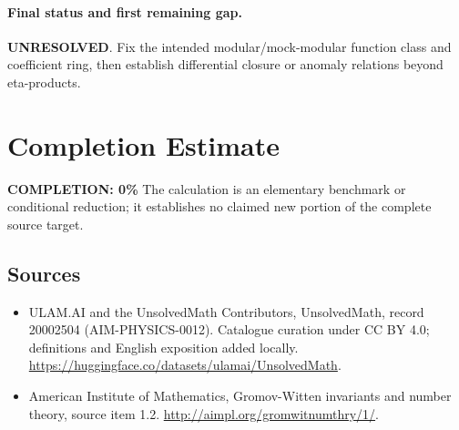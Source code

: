 \documentclass[11pt]{article}
\begin{document}
\paragraph{Final status and first remaining gap.}
\textbf{UNRESOLVED}. Fix the intended modular/mock-modular function class and coefficient ring, then establish differential closure or anomaly relations beyond eta-products.

\section{Completion Estimate}
\noindent\textbf{COMPLETION: 0\%}
The calculation is an elementary benchmark or conditional reduction; it establishes no claimed new portion of the complete source target.

\subsection{Sources}
\begin{itemize}
\item[\hypertarget{source:20002504:1}{S1}] ULAM.AI and the UnsolvedMath Contributors, UnsolvedMath, record 20002504 (AIM-PHYSICS-0012). Catalogue curation under CC BY 4.0; definitions and English exposition added locally.
\url{https://huggingface.co/datasets/ulamai/UnsolvedMath}.
\item[\hypertarget{source:20002504:2}{S2}] American Institute of Mathematics, Gromov-Witten invariants and number theory, source item 1.2.
\url{http://aimpl.org/gromwitnumthry/1/}.
\end{itemize}
\label{end:20002504}
\end{document}
